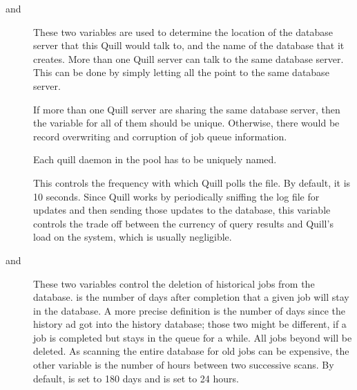 \begin{description}

\item[ and ]
These two variables are used to determine the location of the database
server that this Quill would talk to, and the name of the database that
it creates.  More than one Quill server can talk to the same database
server.  This can be done by simply letting all the 
 point to the same database server.

If more than one Quill server are sharing the same database
server, then the  variable for all of them should
be unique.  Otherwise, there would be record overwriting and corruption
of job queue information.

\item[]
Each quill daemon in the pool has to be uniquely named.

\item[]
This controls the frequency with which Quill polls the
 file.  By default, it is 10 seconds.  Since Quill
works by periodically sniffing the log file for updates and then sending
those updates to the database, this variable controls the trade off between
the currency of query results and Quill's load on the system, which
is usually negligible.

\item[ and 
		]
These two variables control the deletion of historical jobs from the
database. 
 is the number of days
after completion that a given job will stay in the database.  
A more precise definition is the number of days since the history ad got 
into the history database; those two might be different,
if a job is completed but stays in the queue for a while.
All jobs beyond  will be deleted.
As scanning the entire database for old jobs can be expensive,
the other variable 
is the number of hours between two successive scans.  By default,
 is set to 180 days and
 is set to 24 hours.


\end{description}
